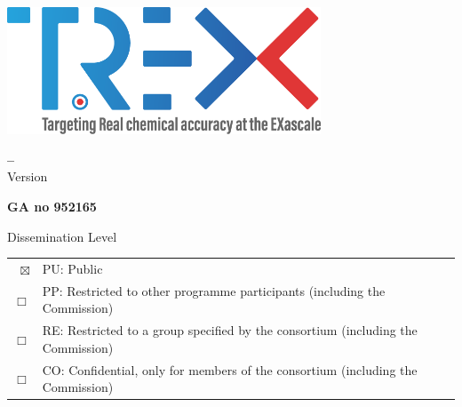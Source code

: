 
\pagestyle{empty}

\begin{center}

\phantom{} \\  \vspace{2cm}

  \includegraphics[width=0.7\textwidth]{images/trex-logo.png}

  \vspace{2cm}

    \textbf{\Huge \DelNumber -- \DelTitle}\\\vspace{1cm}
    {\Large Version \DelVersion}

 \vspace*{\fill}

  {\huge \textbf{GA no 952165}}
  \vspace{1cm}


\end{center}
\noindent
  Dissemination Level\\[5mm]
  \newcommand{\Dissemination}{PU}    %
  \begin{tabular*} {\textwidth}{rl}
$\boxtimes$  & PU: Public  \\   %
$\Box$       & PP: Restricted to other programme participants (including the Commission) \\
$\Box$       & RE: Restricted to a group specified by the consortium (including the Commission) \\
$\Box$       & CO: Confidential, only for members of the consortium (including the Commission)
  \end{tabular*} \\



\clearpage

